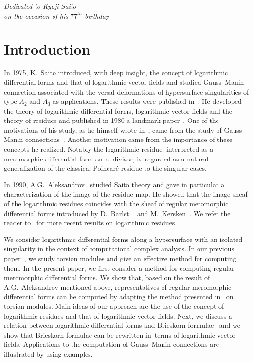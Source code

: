 \documentclass[pdftex]{sigma}%
\numberwithin{equation}{section}
\begin{document}


\begin{flushright}
\begin{minipage}{60mm}
{\it Dedicated to Kyoji Saito } \\
{\it on the occasion of his $77^{th}$ birthday}
\end{minipage}
\end{flushright}

\renewcommand{\thefootnote}{\arabic{footnote}}
\setcounter{footnote}{0}

\section{Introduction}
In 1975, K.~Saito introduced, with deep insight, the concept of logarithmic differential forms and that of logarithmic vector fields and studied Gauss--Manin connection associated with the versal deformations of hypersurface singularities of type $A_2$ and $A_3$ as applications. These results were published in~\cite{S77}. He developed the theory of logarithmic differential forms, logarithmic vector fields and the theory of residues and published in 1980 a landmark paper~\cite{S}. One of the motivations of his study, as he himself wrote in~\cite{S}, came from the study of Gauss--Manin connections~\cite{B,S73}. Another motivation came from the importance of these concepts he realized.
Notably the logarithmic residue, interpreted as a meromorphic differential form on~a~divisor, is~regarded as a natural generalization of the classical Poincar\'e residue to the singular cases.

In 1990, A.G.~Aleksandrov~\cite{A} studied Saito theory and gave in particular a characterization of the image of the residue map. He showed
that the image sheaf of the logarithmic residues coincides with the sheaf of regular meromorphic differential forms introduced by D.~Barlet ~\cite{B} and M.~Kersken~\cite{K83,K84}.
We refer the reader to~\cite{AT,Bru,CM1,CM2,GS,P,P2} for more recent results on logarithmic residues.

We consider logarithmic differential forms along a hypersurface with an isolated singularity in the context of computational complex analysis. In our previous paper~\cite{TN20}, we study torsion modules and give an effective method for computing them.
In the present paper, we first consider a method for computing regular meromorphic differential forms. We show that, based on the result of A.G.~Aleksandrov mentioned above, representatives of regular meromorphic differential forms can be computed by adapting the method presented in~\cite{TN20} on torsion modules. Main ideas of our approach are the use of the concept of logarithmic residues and that of logarithmic vector fields. Next, we discuss a relation between logarithmic differential forms and Brieskorn formulae~\cite{B,Sch,Schu} and we show that Brieskorn formulae can be rewritten in~terms of logarithmic vector fields. Applications to the computation of Gauss--Manin connections are illustrated by using examples.
\end{document}
